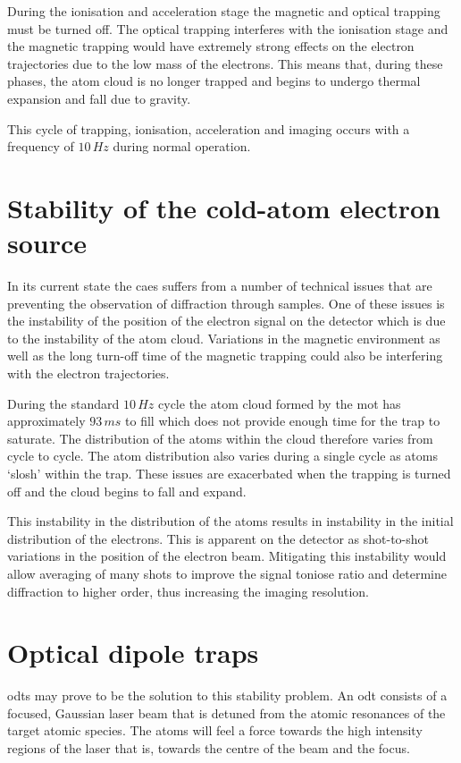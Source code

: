 During the ionisation and acceleration stage the magnetic and optical trapping must be turned off. The optical trapping interferes with the ionisation stage and the magnetic trapping would have extremely strong effects on the electron trajectories due to the low mass of the electrons. This means that, during these phases, the atom cloud is no longer trapped and begins to undergo thermal expansion and fall due to gravity.

This cycle of trapping, ionisation, acceleration and imaging occurs with a frequency of $10\,\unit{Hz}$ during normal operation.

\section{Stability of the cold-atom electron source}

In its current state the \gls{caes} suffers from a number of technical issues that are preventing the observation of diffraction through samples. One of these issues is the instability of the position of the electron signal on the detector which is due to the instability of the atom cloud. Variations in the magnetic environment as well as the long turn-off time of the magnetic trapping could also be interfering with the electron trajectories.

During the standard $10\,\unit{Hz}$ cycle the atom cloud formed by the \gls{mot} has approximately $93\,\unit{ms}$ to fill which does not provide enough time for the trap to saturate. The distribution of the atoms within the cloud therefore varies from cycle to cycle. The atom distribution also varies during a single cycle as atoms `slosh' within the trap. These issues are exacerbated when the trapping is turned off and the cloud begins to fall and expand.

This instability in the distribution of the atoms results in instability in the initial distribution of the electrons. This is apparent on the detector as shot-to-shot variations in the position of the electron beam. Mitigating this instability would allow averaging of many shots to improve the signal toniose ratio and determine diffraction to higher order, thus increasing the imaging resolution.

\section{Optical dipole traps}

\Glspl{odt} may prove to be the solution to this stability problem. An \gls{odt} consists of a focused, Gaussian laser beam that is detuned from the atomic resonances of the target atomic species. The atoms will feel a force towards the high intensity regions of the laser that is, towards the centre of the beam and the focus.

